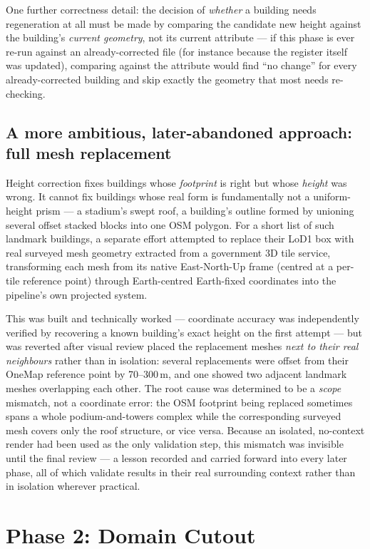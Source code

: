 \documentclass[11pt]{article}
\begin{document}
One further correctness detail: the decision of \emph{whether} a building needs regeneration
at all must be made by comparing the candidate new height against the building's
\emph{current geometry}, not its current attribute --- if this phase is ever re-run against an
already-corrected file (for instance because the register itself was updated), comparing
against the attribute would find ``no change'' for every already-corrected building and skip
exactly the geometry that most needs re-checking.

\subsection{A more ambitious, later-abandoned approach: full mesh replacement}

Height correction fixes buildings whose \emph{footprint} is right but whose \emph{height} was
wrong. It cannot fix buildings whose real form is fundamentally not a uniform-height prism ---
a stadium's swept roof, a building's outline formed by unioning several offset stacked blocks
into one OSM polygon. For a short list of such landmark buildings, a separate effort attempted
to replace their LoD1 box with real surveyed mesh geometry extracted from a government 3D
tile service, transforming each mesh from its native East-North-Up frame (centred at a
per-tile reference point) through Earth-centred Earth-fixed coordinates into the pipeline's
own projected system.

This was built and technically worked --- coordinate accuracy was independently verified by
recovering a known building's exact height on the first attempt --- but was reverted after
visual review placed the replacement meshes \emph{next to their real neighbours} rather than
in isolation: several replacements were offset from their OneMap reference point by 70--300\,m,
and one showed two adjacent landmark meshes overlapping each other. The root cause was
determined to be a \emph{scope} mismatch, not a coordinate error: the OSM footprint being
replaced sometimes spans a whole podium-and-towers complex while the corresponding surveyed
mesh covers only the roof structure, or vice versa. Because an isolated, no-context render had
been used as the only validation step, this mismatch was invisible until the final review ---
a lesson recorded and carried forward into every later phase, all of which validate results in
their real surrounding context rather than in isolation wherever practical.

\section{Phase 2: Domain Cutout}
\label{sec:cutout}
\end{document}
